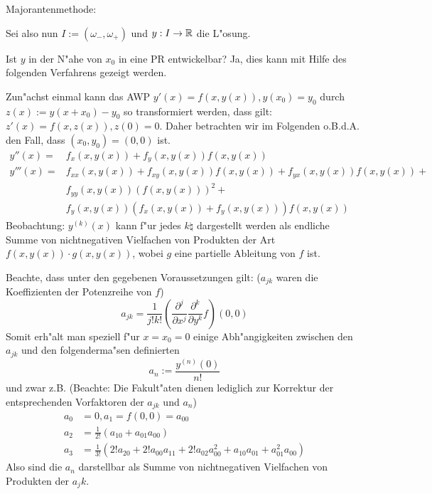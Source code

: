 \deduction Majorantenmethode:{
  Sei also nun $I:=(\omega_-,\omega_+)$ und $y:I\to\mathbb R$ die L"osung.
  
  Ist $y$ in der N"ahe von $x_0$ in eine PR entwickelbar? 
  Ja, dies kann mit Hilfe des folgenden Verfahrens gezeigt werden.
  
  Zun"achst einmal kann das AWP $y'(x)=f(x,y(x)),y(x_0)=y_0$ durch
  $z(x):=y(x+x_0)-y_0$ so transformiert werden, dass gilt:
  $z'(x)=f(x,z(x)),z(0)=0$. Daher betrachten wir im Folgenden
  o.B.d.A. den Fall, dass $(x_0,y_0)=(0,0)$ ist.
  \begin{align*}
    y''(x)=&f_x(x,y(x))+f_y(x,y(x))f(x,y(x))\\
    y'''(x)=&f_{xx}(x,y(x))+f_{xy}(x,y(x))f(x,y(x))+f_{yx}(x,y(x))f(x,y(x))+\\
      &f_{yy}(x,y(x))(f(x,y(x)))^2+\\
      &f_y(x,y(x))(f_x(x,y(x))+f_y(x,y(x)))f(x,y(x))
    \end{align*}
  Beobachtung: $y^{(k)}(x)$ kann f"ur jedes $k\natural$ dargestellt werden
  als endliche Summe von nichtnegativen Vielfachen von Produkten der Art 
  $f(x,y(x))\cdot g(x,y(x))$, wobei $g$ eine partielle Ableitung von $f$
  ist.
  
  Beachte, dass unter den gegebenen Voraussetzungen gilt: ($a_{jk}$ waren
  die Koeffizienten der Potenzreihe von $f$)
  \[a_{jk}=\frac 1 {j!k!} \left( \frac{\partial^j}{\partial x^j}
    \frac{\partial^k}{\partial y^k} f\right)(0,0)
    \]
  Somit erh"alt man speziell f"ur $x=x_0=0$ einige Abh"angigkeiten zwischen 
  den $a_{jk}$ und den folgenderma"sen definierten
  \[a_n:=\frac{y^{(n)}(0)}{n!}
    \]
  und zwar z.B. (Beachte: Die Fakult"aten dienen lediglich zur Korrektur
  der entsprechenden Vorfaktoren der $a_{jk}$ und $a_n$)
  \begin{align*}
    a_0&=0,a_1=f(0,0)=a_{00}\\
    a_2&=\frac 1 {2!} (a_{10}+a_{01}a_{00})\\
    a_3&=\frac 1 {3!} (2!a_{20}+2!a_{00}a_{11}+2!a_{02}a_{00}^2+a_{10}a_{01}+a_{01}^2a_{00})
    \end{align*}
  Also sind die $a_n$ darstellbar als Summe von nichtnegativen
  Vielfachen von Produkten der $a_jk$. 
  
}
